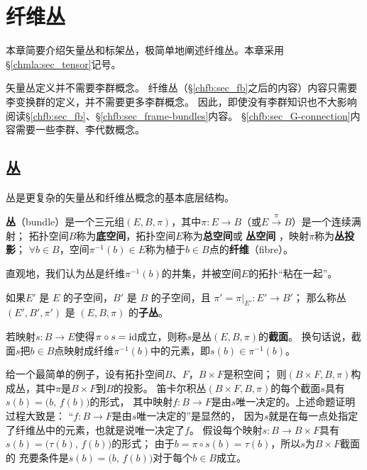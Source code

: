 \chapter{纤维丛}\label{appx:bundle}

本章简要介绍矢量丛和标架丛，极简单地阐述纤维丛。本章采用\S\ref{chmla:sec_tensor}记号。

矢量丛定义并不需要李群概念。
纤维丛（\S\ref{chfb:sec_fb}之后的内容）内容只需要李变换群的定义，并不需要更多李群概念。
因此，即使没有李群知识也不大影响阅读\S\ref{chfb:sec_fb}、\S\ref{chfb:sec_frame-bundles}内容。
\S\ref{chfb:sec_G-connection}内容需要一些李群、李代数概念。

\section{丛}
丛是更复杂的矢量丛和纤维丛概念的基本底层结构。

\begin{definition}
    \textbf{丛}（bundle）是一个三元组$(E, B, \pi)$，其中$\pi: E\to B$（或$E\xrightarrow{\pi} B$）是一个连续满射；
    拓扑空间$B$称为\textbf{底空间}，拓扑空间$E$称为\textbf{总空间}或 \textbf{丛空间} ，映射$\pi$称为\textbf{丛投影}；
    $\forall b\in B$，空间$\pi^{-1}(b)\in E$称为植于$ b\in B$点的\textbf{纤维}（fibre）。
\end{definition}
直观地，我们认为丛是纤维$\pi^{-1}(b)$的并集，并被空间$E$的拓扑“粘在一起”。


\begin{definition}
     如果$E'$ 是 $E$ 的子空间，$B'$ 是 $B$ 的子空间，且 $ \pi' = \pi |_{E'}: E'\to B'$；
     那么称丛 $(E',  B',\pi')$ 是 $(E, B,\pi)$ 的\textbf{子丛}。
\end{definition}

\begin{definition}
    若映射$s: B\to E$使得$\pi \circ s = {\rm id}$成立，则称$s$是丛$(E, B,\pi)$的\textbf{截面}。
    换句话说，截面$s$把$b\in B$点映射成纤维$\pi^{-1}(b)$中的元素，即$s(b)\in \pi^{-1}(b)$。
\end{definition}
    


给一个最简单的例子，设有拓扑空间$B$、$F$，$B\times F$是积空间；
则$(B\times F, B,\pi)$构成丛，其中$\pi$是$B\times F$到$B$的投影。
笛卡尔积丛$(B \times F, B,\pi)$的每个截面$s$具有$s(b) = \bigl(b,\, f(b)\bigr)$的形式，
其中映射$f: B\to F$是由$s$唯一决定的。上述命题证明过程大致是：
“$f: B\to F$是由$s$唯一决定的”是显然的，
因为$s$就是在每一点处指定了纤维丛中的元素，也就是说唯一决定了$f$。
假设每个映射$s: B\to B\times F$具有$s(b) = \bigl(\tau(b), \, f (b)\bigr)$的形式；
由于$b=\pi \circ s(b) = \tau(b)$，所以$s$为$B\times F$截面的
充要条件是$s(b) = \bigl(b,\, f(b)\bigr)$对于每个$b\in B$成立。

